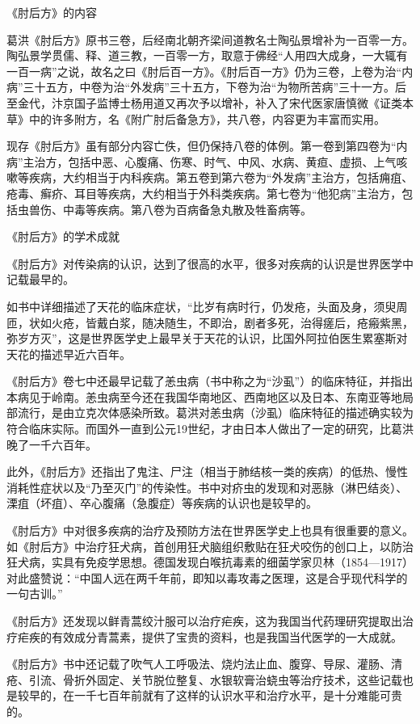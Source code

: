 \documentclass[12pt,UTF8]{ctexbook}
\begin{document}
《肘后方》的内容

葛洪《肘后方》原书三卷，后经南北朝齐梁间道教名士陶弘景增补为一百零一方。陶弘景学贯儒、释、道三教，一百零一方，取意于佛经“人用四大成身，一大辄有一百一病”之说，故名之曰《肘后百一方》。《肘后百一方》仍为三卷，上卷为治“内病”三十五方，中卷为治“外发病”三十五方，下卷为治“为物所苦病”三十一方。后至金代，汴京国子监博士杨用道又再次予以增补，补入了宋代医家唐慎微《证类本草》中的许多附方，名《附广肘后备急方》，共八卷，内容更为丰富而实用。

现存《肘后方》虽有部分内容亡佚，但仍保持八卷的体例。第一卷到第四卷为“内病”主治方，包括中恶、心腹痛、伤寒、时气、中风、水病、黄疸、虚损、上气咳嗽等疾病，大约相当于内科疾病。第五卷到第六卷为“外发病”主治方，包括痈疽、疮毒、癣疥、耳目等疾病，大约相当于外科类疾病。第七卷为“他犯病”主治方，包括虫兽伤、中毒等疾病。第八卷为百病备急丸散及牲畜病等。

《肘后方》的学术成就

《肘后方》对传染病的认识，达到了很高的水平，很多对疾病的认识是世界医学中记载最早的。

如书中详细描述了天花的临床症状，“比岁有病时行，仍发疮，头面及身，须臾周匝，状如火疮，皆戴白浆，随决随生，不即治，剧者多死，治得瘥后，疮瘢紫黑，弥岁方灭”，这是世界医学史上最早关于天花的认识，比国外阿拉伯医生累塞斯对天花的描述早近六百年。

《肘后方》卷七中还最早记载了恙虫病（书中称之为“沙虱”）的临床特征，并指出本病见于岭南。恙虫病至今还在我国华南地区、西南地区以及日本、东南亚等地局部流行，是由立克次体感染所致。葛洪对恙虫病（沙虱）临床特征的描述确实较为符合临床实际。而国外一直到公元19世纪，才由日本人做出了一定的研究，比葛洪晚了一千六百年。

此外，《肘后方》还指出了鬼注、尸注（相当于肺结核一类的疾病）的低热、慢性消耗性症状以及“乃至灭门”的传染性。书中对疥虫的发现和对恶脉（淋巴结炎）、溧疽（坏疽）、卒心腹痛（急腹症）等疾病的认识也是较早的。

《肘后方》中对很多疾病的治疗及预防方法在世界医学史上也具有很重要的意义。如《肘后方》中治疗狂犬病，首创用狂犬脑组织敷贴在狂犬咬伤的创口上，以防治狂犬病，实具有免疫学思想。德国发现白喉抗毒素的细菌学家贝林（1854—1917）对此盛赞说：“中国人远在两千年前，即知以毒攻毒之医理，这是合乎现代科学的一句古训。”

《肘后方》还发现以鲜青蒿绞汁服可以治疗疟疾，这为我国当代药理研究提取出治疗疟疾的有效成分青蒿素，提供了宝贵的资料，也是我国当代医学的一大成就。

《肘后方》书中还记载了吹气人工呼吸法、烧灼法止血、腹穿、导尿、灌肠、清疮、引流、骨折外固定、关节脱位整复、水银软膏治蛲虫等治疗技术，这些记载也是较早的，在一千七百年前就有了这样的认识水平和治疗水平，是十分难能可贵的。
\end{document}
